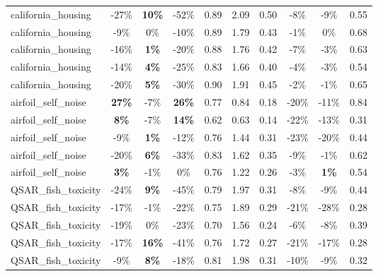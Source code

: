 \begin{table}[!htbp]
\begin{small}
\begin{sc}
{\begin{tabular}{lccccccccc}
california\_housing & -27\% & \textbf{10\%} & -52\% & 0.89 & 2.09 & 0.50 & -8\% & -9\% & 0.55 \\
california\_housing & -9\% & 0\% & -10\% & 0.89 & 1.79 & 0.43 & -1\% & 0\% & 0.68 \\
california\_housing & -16\% & \textbf{1\%} & -20\% & 0.88 & 1.76 & 0.42 & -7\% & -3\% & 0.63 \\
california\_housing & -14\% & \textbf{4\%} & -25\% & 0.83 & 1.66 & 0.40 & -4\% & -3\% & 0.54 \\
california\_housing & -20\% & \textbf{5\%} & -30\% & 0.90 & 1.91 & 0.45 & -2\% & -1\% & 0.65 \\
airfoil\_self\_noise & \textbf{27\%} & -7\% & \textbf{26\%} & 0.77 & 0.84 & 0.18 & -20\% & -11\% & 0.84 \\
airfoil\_self\_noise & \textbf{8\%} & -7\% & \textbf{14\%} & 0.62 & 0.63 & 0.14 & -22\% & -13\% & 0.31 \\
airfoil\_self\_noise & -9\% & \textbf{1\%} & -12\% & 0.76 & 1.44 & 0.31 & -23\% & -20\% & 0.44 \\
airfoil\_self\_noise & -20\% & \textbf{6\%} & -33\% & 0.83 & 1.62 & 0.35 & -9\% & -1\% & 0.62 \\
airfoil\_self\_noise & \textbf{3\%} & -1\% & 0\% & 0.76 & 1.22 & 0.26 & -3\% & \textbf{1\%} & 0.54 \\
QSAR\_fish\_toxicity & -24\% & \textbf{9\%} & -45\% & 0.79 & 1.97 & 0.31 & -8\% & -9\% & 0.44 \\
QSAR\_fish\_toxicity & -17\% & -1\% & -22\% & 0.75 & 1.89 & 0.29 & -21\% & -28\% & 0.28 \\
QSAR\_fish\_toxicity & -19\% & 0\% & -23\% & 0.70 & 1.56 & 0.24 & -6\% & -8\% & 0.39 \\
QSAR\_fish\_toxicity & -17\% & \textbf{16\%} & -41\% & 0.76 & 1.72 & 0.27 & -21\% & -17\% & 0.28 \\
QSAR\_fish\_toxicity & -9\% & \textbf{8\%} & -18\% & 0.81 & 1.98 & 0.31 & -10\% & -9\% & 0.32 \\
\bottomrule
\end{tabular}
}
\end{sc}
\end{small}
\end{table}
